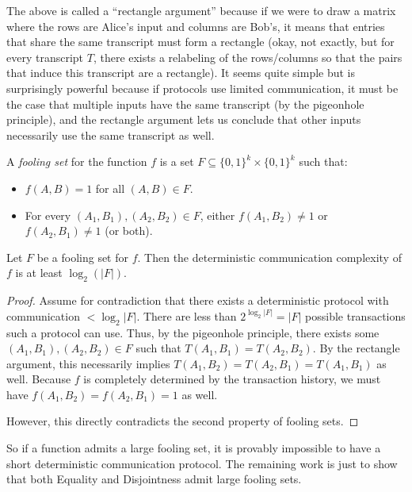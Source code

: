   The above is called a ``rectangle argument'' because if we were to draw a matrix
  where the rows are Alice's input and columns are Bob's, it means that entries
  that share the same transcript must form a rectangle (okay, not exactly, but for
  every transcript $T$, there exists a relabeling of the rows/columns so that the
  pairs that induce this transcript are a rectangle). It seems quite simple but is
  surprisingly powerful because if protocols use limited communication, it must be
  the case that multiple inputs have the same transcript
  (by the pigeonhole principle), and the rectangle
  argument lets us conclude that other inputs necessarily use the same transcript
  as well. 

  \begin{definition} A \emph{fooling set} for the function $f$ is a set $F
  \subseteq \{0,1\}^k \times \{0,1\}^k$ such that: \begin{itemize} \item $f(A, B)
      = 1$ for all $(A, B) \in F$.  \item For every $(A_1, B_1), (A_2, B_2) \in
        F$, either $f(A_1, B_2) \neq 1$ or $f(A_2, B_1) \neq 1$ (or both).
    \end{itemize} \end{definition}

  \begin{proposition}
    Let $F$ be a fooling set for $f$. Then the deterministic
    communication complexity of $f$ is at least $\log_2(|F|)$.  
  \end{proposition}
  \begin{proof} 
    Assume for contradiction that there exists a deterministic
    protocol with communication $< \log_2|F|$.
    There are less than $2^{\log_2|F|}=|F|$ possible transactions such a
    protocol can use.
    Thus, by the pigeonhole principle,
    there exists some $(A_1, B_1), (A_2, B_2) \in F$ such that 
    $T(A_1, B_1) = T(A_2, B_2)$.
    By the rectangle argument, this necessarily implies $T(A_1, B_2)
    = T(A_2, B_1) = T(A_1, B_1)$ as well. 
    Because $f$ is completely determined by the transaction history,
    we must have $f(A_1, B_2) = f(A_2, B_1) = 1$ as well.

    However, this directly contradicts the second property of fooling sets.
  \end{proof}

  So if a function admits a large fooling set, it is provably impossible to have a
  short deterministic communication protocol. The remaining work is just to show
  that both Equality and Disjointness admit large fooling sets.


